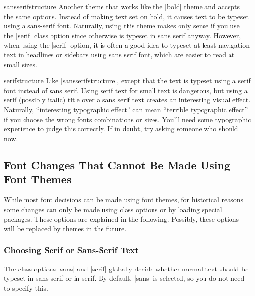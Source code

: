 \begin{fontthemeexample}{sansserifstructure}
  Another theme that works like the |bold| theme and accepts the same
  options. Instead of making text set on bold, it causes text to be
  typeset using a sans-serif font. Naturally, using this theme makes
  only sense if you use the |serif| class option since otherwise is
  typeset in sans serif anyway. However, when using the |serif|
  option, it is often a good idea to typeset at least navigation text
  in headlines or sidebars using sans serif font, which are easier to
  read at small sizes.
\end{fontthemeexample}

\begin{fontthemeexample}{serifstructure}
  Like |sansserifstructure|, except that the text is typeset using a serif
  font instead of sans serif. Using serif text for small text is
  dangerous, but using a serif (possibly italic) title over a sans
  serif text creates an interesting visual effect. Naturally,
  ``interesting typographic effect'' can mean ``terrible typographic
  effect'' if you choose the wrong fonts combinations or sizes. You'll
  need some typographic  experience to judge this correctly. If in
  doubt, try asking someone who should now.
\end{fontthemeexample}






\subsection{Font Changes That Cannot Be Made Using Font Themes} 

While most font decisions can be made using font themes, for
historical reasons some changes can only be made using class
options or by loading special packages. These options are explained in
the following. Possibly, these options will be replaced by themes in
the future. 



\subsubsection{Choosing Serif or Sans-Serif Text}

The class options |sans| and |serif| globally decide whether normal
text should be typeset in sans-serif or in serif. By default, |sans|
is selected, so you do not need to specify this.

